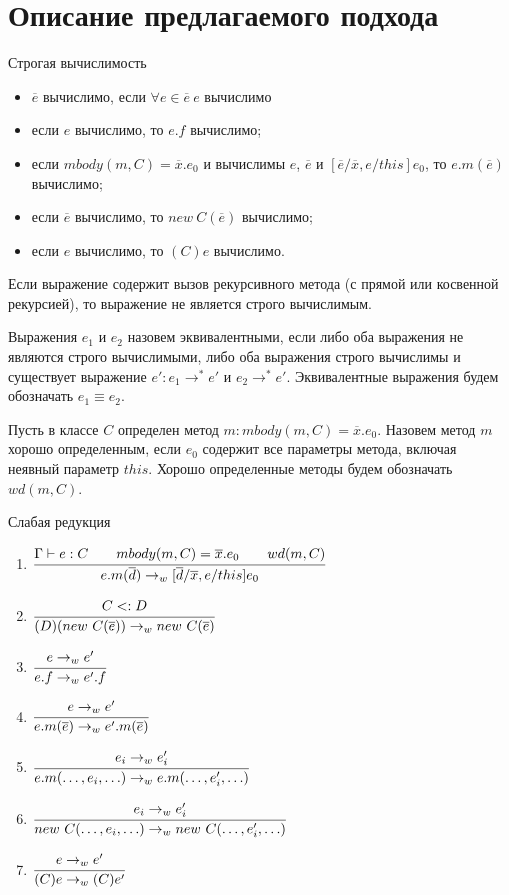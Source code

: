 \chapter{Описание предлагаемого подхода}
\begin{definition}
Строгая вычислимость
\begin{itemize}
    \item $\overline{e}$ вычислимо, если $\forall e \in \overline{e}\ e$ вычислимо
    \item если $e$ вычислимо, то $e.f$ вычислимо;
    \item если $mbody(m, C) = \overline{x}.e_0$ и вычислимы $e$, $\overline{e}$ и $[\overline{e}/\overline{x}, e/this]e_0$, то $e.m(\overline{e})$ вычислимо;
    \item если $\overline{e}$ вычислимо, то $new\ C(\overline{e})$ вычислимо;
    \item если $e$ вычислимо, то $(C) e$ вычислимо.
\end{itemize}
Если выражение содержит вызов рекурсивного метода (с прямой или косвенной рекурсией), то выражение не является строго вычислимым.
\end{definition}
\begin{definition}
Выражения $e_1$ и $e_2$ назовем эквивалентными, если либо оба выражения не являются строго вычислимыми,
либо оба выражения строго вычислимы и существует выражение $e' : e_1 \rightarrow^* e'$ и $e_2 \rightarrow^* e'$. Эквивалентные выражения будем обозначать $e_1 \equiv e_2$.
\end{definition}
\begin{definition}
Пусть в классе $C$ определен метод $m : mbody(m, C) = \overline{x}.e_0$.
Назовем метод $m$ хорошо определенным, если $e_0$ содержит все параметры метода,
включая неявный параметр $this$. Хорошо определенные методы будем обозначать $wd(m, C)$.
\end{definition}
\begin{definition}
Слабая редукция
\begin{enumerate}
    \item $\cfrac{\Gamma \vdash e : C \qquad mbody(m, C) = \overline{x}.e_0 \qquad wd(m, C)}{e.m(\overline{d}) \rightarrow_w [\overline{d}/\overline{x}, e/this]e_0}$
    \item $\cfrac{C <: D}{(D)(new\ C(\overline{e})) \rightarrow_w new\ C(\overline{e})}$
    \item $\cfrac{e \rightarrow_w e'}{e.f \rightarrow_w e'.f}$
    \item $\cfrac{e \rightarrow_w e'}{e.m(\overline{e}) \rightarrow_w e'.m(\overline{e})}$
    \item $\cfrac{e_i \rightarrow_w e_i'}{e.m(\ldots,e_i,\ldots) \rightarrow_w e.m(\ldots,e_i',\ldots)}$
    \item $\cfrac{e_i \rightarrow_w e_i'}{new\ C(\ldots,e_i,\ldots) \rightarrow_w new\ C(\ldots,e_i',\ldots)}$
    \item $\cfrac{e \rightarrow_w e'}{(C)e \rightarrow_w (C)e'}$
\end{enumerate}
\end{definition}

